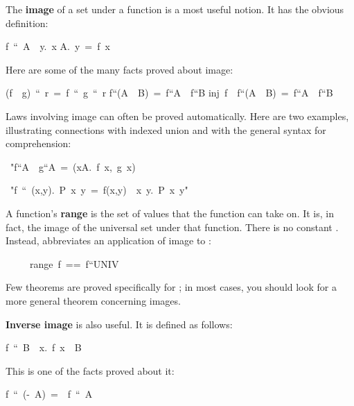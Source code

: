 \medskip

The \textbf{image} of a set under a function is a most useful notion.  It
has the obvious definition: 
\begin{isabelle}
f\ ``\ A\ \isasymequiv\ {\isacharbraceleft}y.\ {\isasymexists}x\isasymin
A.\ y\ =\ f\ x\isacharbraceright
{}
\end{isabelle}
%
Here are some of the many facts proved about image: 
\begin{isabelle}
(f\ \isasymcirc\ g)\ ``\ r\ =\ f\ ``\ g\ ``\ r
\isanewline
f``(A\ \isasymunion\ B)\ =\ f``A\ \isasymunion\ f``B
\isanewline
inj\ f\ \isasymLongrightarrow\ f``(A\ \isasyminter\
B)\ =\ f``A\ \isasyminter\ f``B
\end{isabelle}


Laws involving image can often be proved automatically. Here 
are two examples, illustrating connections with indexed union and with the
general syntax for comprehension:
\begin{isabelle}
\ "f``A\ \isasymunion\ g``A\ =\ ({\isasymUnion}x{\isasymin}A.\ {\isacharbraceleft}f\ x,\ g\
x\isacharbraceright)
\par\smallskip
{}\ "f\ ``\ \isacharbraceleft(x,y){.}\ P\ x\ y\isacharbraceright\ =\ {\isacharbraceleft}f(x,y)\ \isacharbar\ x\ y.\ P\ x\
y\isacharbraceright"
\end{isabelle}

\medskip
 A function's \textbf{range} is the set of values that the function can 
take on. It is, in fact, the image of the universal set under 
that function. There is no constant {}.  Instead, {} 
abbreviates an application of image to {\isa{UNIV}}: 
\begin{isabelle}
\ \ \ \ \ range\ f\
{==}\ f``UNIV
\end{isabelle}
%
Few theorems are proved specifically 
for {}; in most cases, you should look for a more general
theorem concerning images.

\medskip
\textbf{Inverse image} is also  useful. It is defined as follows: 
\begin{isabelle}
f\ \isacharminus``\ B\ \isasymequiv\ {\isacharbraceleft}x.\ f\ x\ \isasymin\ B\isacharbraceright
{}
\end{isabelle}
%
This is one of the facts proved about it:
\begin{isabelle}
f\ \isacharminus``\ (-\ A)\ =\ \isacharminus\ f\ \isacharminus``\ A%
\end{isabelle}


